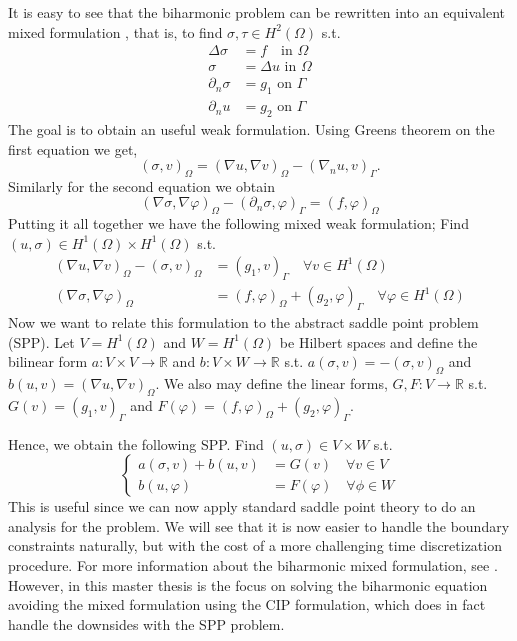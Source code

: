 It is easy to see that the biharmonic problem can be rewritten into an equivalent mixed formulation , that is, to find $\sigma, \tau  \in H^2( \Omega ) $ s.t. \[
    \begin{split}
\Delta \sigma  & = f \quad  \text{in } \Omega \\
\sigma   & = \Delta u  \text{ in } \Omega \\
\partial _{n} \sigma  & = g_{1} \text{ on } \Gamma  \\
\partial _{n} u   & = g_{2} \text{ on } \Gamma
    \end{split}
\]
The goal is to obtain an useful weak formulation. Using Greens theorem on the first equation we get,
\[
( \sigma, v)_{\Omega } = ( \nabla  u , \nabla v  )_{\Omega } - ( \nabla _{n} u , v) _{\Gamma }.
\]
Similarly for the second equation we obtain
\[
( \nabla \sigma , \nabla \varphi  )_{\Omega} - ( \partial _{n} \sigma ,  \varphi )_{\Gamma } = ( f,\varphi ) _{\Omega}
\]
Putting it all together we have the following mixed weak formulation; Find $( u, \sigma ) \in H^{1}( \Omega ) \times H^{1}( \Omega )  $ s.t. \[
    \begin{split}
     ( \nabla  u , \nabla v  )_{\Omega } -( \sigma, v)_{\Omega }  & =   ( g_{1} , v) _{\Gamma } \quad  \forall v \in H^{1}( \Omega ) \\
( \nabla \sigma , \nabla \varphi  )_{\Omega}  & = ( f,\varphi ) _{\Omega} + ( g_{2} ,  \varphi )_{\Gamma } \quad  \forall \varphi \in H^{1}( \Omega )
    \end{split}
\]
Now we want to relate this formulation to the abstract saddle point problem (SPP).
Let $V = H^{1}( \Omega ) $  and $W=H^{1}( \Omega ) $ be  Hilbert spaces and define the bilinear form $a: V\times V \to \mathbb{R}  $ and $b: V \times W \to \mathbb{R} $ s.t. $a( \sigma,v ) = - ( \sigma , v) _{\Omega }  $ and $b( u,v) = ( \nabla u,
\nabla v)_{\Omega  }  $. We also may define the linear forms, $G,F: V \to \mathbb{R} $ s.t. $ G( v)  = ( g_{1}, v) _{\Gamma } $ and $F( \varphi ) = ( f, \varphi )_{\Omega } + ( g_{2}, \varphi )_{\Gamma } $.

Hence, we obtain the following SPP. Find $( u,\sigma ) \in V \times W$ s.t.  \[
    \begin{cases}
       a( \sigma ,v) + b ( u, v )  & = G( v)   \quad  \forall v \in V \\
       b( u, \varphi  )  & = F( \varphi )     \quad \forall \phi \in W
    \end{cases}
\]
This is useful since we can now apply standard saddle point theory to do an analysis for the problem. We will see that it is now easier to handle the boundary constraints naturally, but with the cost of a more challenging time discretization
procedure.
For more information about the biharmonic mixed formulation, see \cite{babuvska1980analysis,cai2023nitsche}.
However, in this master thesis is the focus on solving the biharmonic equation avoiding the mixed formulation using the CIP formulation, which does in fact handle the downsides with the SPP problem.






